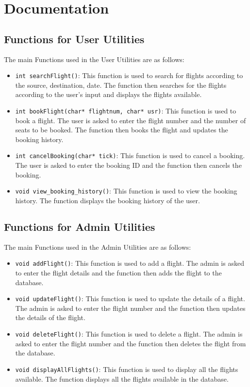 \documentclass[a4paper]{scrartcl}
\begin{document}
\section{Documentation}
\subsection{Functions for User Utilities}
The main Functions used in the User Utilities are as follows:
\begin{itemize}
    \item  \texttt{int searchFlight()}: This function is used to search for flights according to the source, destination, date. The function then searches for the flights according to the user's input and displays the flights available.\\
    \item \texttt{int bookFlight(char* flightnum, char* usr)}: This function is used to book a flight. The user is asked to enter the flight number and the number of seats to be booked. The function then books the flight and updates the booking history.\\
    \item \texttt{int cancelBooking(char* tick)}: This function is used to cancel a booking. The user is asked to enter the booking ID and the function then cancels the booking.\\
    \item \texttt{void view\_booking\_history()}: This function is used to view the booking history. The function displays the booking history of the user.\\
\end{itemize}
\subsection{Functions for Admin Utilities}
The main Functions used in the Admin Utilities are as follows:
\begin{itemize}
    \item \texttt{void addFlight()}: This function is used to add a flight. The admin is asked to enter the flight details and the function then adds the flight to the database.\\
    \item \texttt{void updateFlight()}: This function is used to update the details of a flight. The admin is asked to enter the flight number and the function then updates the details of the flight.\\
    \item \texttt{void deleteFlight()}: This function is used to delete a flight. The admin is asked to enter the flight number and the function then deletes the flight from the database.\\
    \item \texttt{void displayAllFlights()}: This function is used to display all the flights available. The function displays all the flights available in the database.\\
\end{itemize}
\end{document}
